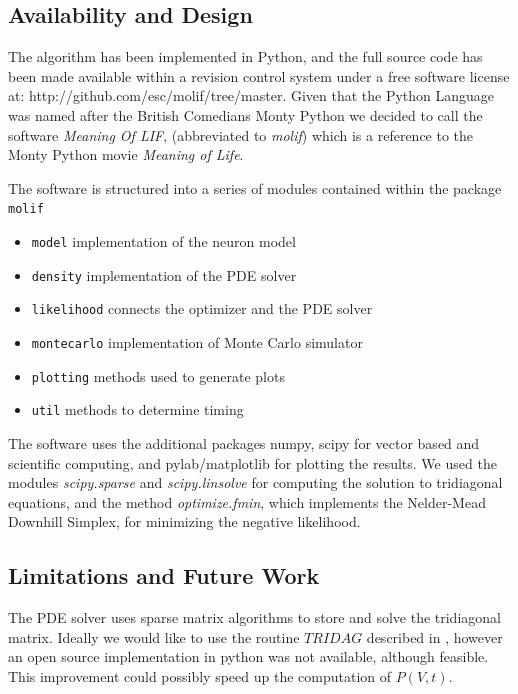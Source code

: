 \documentclass[10pt]{article}
\begin{document}
\subsection{Availability and Design}

The algorithm has been implemented in Python, and the full source code
has been made available within a revision control system under a free
software license at: http://github.com/esc/molif/tree/master. Given
that the Python Language was named after the British Comedians Monty
Python we decided to call the software {\it Meaning Of LIF},
(abbreviated to {\it molif}) which is a reference to the Monty Python
movie {\it Meaning of Life}. 

The software is structured into a series of modules contained within
the package {\tt molif} 

\begin{itemize}
    \item {\tt model} implementation of the neuron model
    \item {\tt density} implementation of the PDE solver 
    \item {\tt likelihood} connects the optimizer and the PDE solver
    \item {\tt montecarlo} implementation of Monte Carlo simulator
    \item {\tt plotting} methods used to generate plots
    \item {\tt util} methods to determine timing
\end{itemize}

The software uses the additional packages numpy, scipy for vector
based and scientific computing, and pylab/matplotlib for plotting the
results. We used the modules {\it scipy.sparse} and {\it
scipy.linsolve} for computing the solution to tridiagonal equations, and the
method {\it optimize.fmin}, which implements the Nelder-Mead Downhill
Simplex, for minimizing the negative likelihood.


\subsection{Limitations and Future Work}

The PDE solver uses sparse matrix algorithms to store and solve the
tridiagonal matrix. Ideally we would like to use the routine $TRIDAG$
described in \cite{press}, however an open source implementation in
python was not available, although feasible. This improvement could
possibly speed up the computation of $P(V,t)$.
\end{document}
